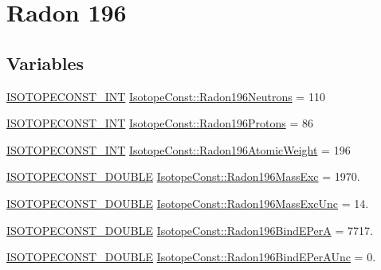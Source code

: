\hypertarget{group___isotope_const-_radon-_rn196}{}\section{Radon 196}
\label{group___isotope_const-_radon-_rn196}
\subsection*{Variables}
\begin{DoxyCompactItemize}
\item 
\mbox{\hyperlink{group___isotope_const-_macros_ga5f18360b3e99483a35c32d789e62621c}{I\+S\+O\+T\+O\+P\+E\+C\+O\+N\+S\+T\+\_\+\+I\+NT}} \mbox{\hyperlink{group___isotope_const-_radon-_rn196_ga2be1973a720191df3edabb79d439c808}{Isotope\+Const\+::\+Radon196\+Neutrons}} = 110
\item 
\mbox{\hyperlink{group___isotope_const-_macros_ga5f18360b3e99483a35c32d789e62621c}{I\+S\+O\+T\+O\+P\+E\+C\+O\+N\+S\+T\+\_\+\+I\+NT}} \mbox{\hyperlink{group___isotope_const-_radon-_rn196_gaa46557f2059d54bd108253ced644f9d4}{Isotope\+Const\+::\+Radon196\+Protons}} = 86
\item 
\mbox{\hyperlink{group___isotope_const-_macros_ga5f18360b3e99483a35c32d789e62621c}{I\+S\+O\+T\+O\+P\+E\+C\+O\+N\+S\+T\+\_\+\+I\+NT}} \mbox{\hyperlink{group___isotope_const-_radon-_rn196_gac7c7065a07e5335adac1ddbc65ab28e4}{Isotope\+Const\+::\+Radon196\+Atomic\+Weight}} = 196
\item 
\mbox{\hyperlink{group___isotope_const-_macros_ga8f45a7272ce02c0b4c65c44636ed719a}{I\+S\+O\+T\+O\+P\+E\+C\+O\+N\+S\+T\+\_\+\+D\+O\+U\+B\+LE}} \mbox{\hyperlink{group___isotope_const-_radon-_rn196_gaa28963c39c01a563f7c80a6a9b49a00a}{Isotope\+Const\+::\+Radon196\+Mass\+Exc}} = 1970.
\item 
\mbox{\hyperlink{group___isotope_const-_macros_ga8f45a7272ce02c0b4c65c44636ed719a}{I\+S\+O\+T\+O\+P\+E\+C\+O\+N\+S\+T\+\_\+\+D\+O\+U\+B\+LE}} \mbox{\hyperlink{group___isotope_const-_radon-_rn196_gaf144345b965ef065d05f4aecd610e176}{Isotope\+Const\+::\+Radon196\+Mass\+Exc\+Unc}} = 14.
\item 
\mbox{\hyperlink{group___isotope_const-_macros_ga8f45a7272ce02c0b4c65c44636ed719a}{I\+S\+O\+T\+O\+P\+E\+C\+O\+N\+S\+T\+\_\+\+D\+O\+U\+B\+LE}} \mbox{\hyperlink{group___isotope_const-_radon-_rn196_gae51a03905cd2f75b504cab231cb8bd69}{Isotope\+Const\+::\+Radon196\+Bind\+E\+PerA}} = 7717.
\item 
\mbox{\hyperlink{group___isotope_const-_macros_ga8f45a7272ce02c0b4c65c44636ed719a}{I\+S\+O\+T\+O\+P\+E\+C\+O\+N\+S\+T\+\_\+\+D\+O\+U\+B\+LE}} \mbox{\hyperlink{group___isotope_const-_radon-_rn196_ga9837c1323ec170bb48dcb2bef547d283}{Isotope\+Const\+::\+Radon196\+Bind\+E\+Per\+A\+Unc}} = 0.

\end{DoxyCompactItemize}
